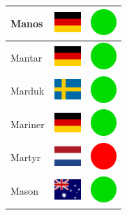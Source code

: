 \documentclass[12pt, a4paper, twoside]{report}
\begin{document}
\begin{center}
\begin{longtable}{|p{5cm}|p{2cm}|p{2cm}|}
 Manos                                                      & \includegraphics[width=1cm]{../img/flags/de} &   \includegraphics[width=1cm]{../likes/y} \\ \hline
 Mantar                                                     & \includegraphics[width=1cm]{../img/flags/de} &   \includegraphics[width=1cm]{../likes/y} \\ \hline
 Marduk                                                     & \includegraphics[width=1cm]{../img/flags/se} &   \includegraphics[width=1cm]{../likes/y} \\ \hline
 Mariner                                                    & \includegraphics[width=1cm]{../img/flags/de} &   \includegraphics[width=1cm]{../likes/y} \\ \hline
 Martyr                                                     & \includegraphics[width=1cm]{../img/flags/nl} &   \includegraphics[width=1cm]{../likes/n} \\ \hline
 Mason                                                      & \includegraphics[width=1cm]{../img/flags/au} &   \includegraphics[width=1cm]{../likes/y} \\ \hline

\end{longtable}
\end{center}
\end{document}
